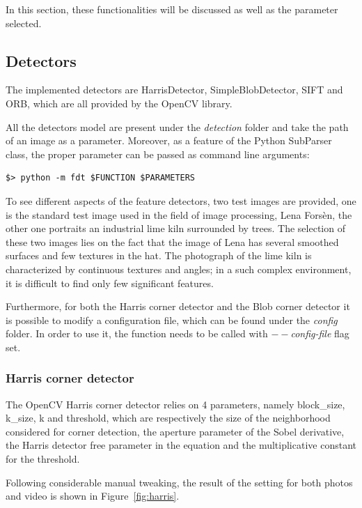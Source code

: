 \documentclass[journal]{IEEEtran}
\begin{document}
In this section, these functionalities will be discussed as well as the parameter selected.

\subsection{Detectors}
The implemented detectors are HarrisDetector, SimpleBlobDetector, SIFT and ORB, which are all provided by the OpenCV library.

All the detectors model are present under the \emph{detection} folder and take the path of an image as a parameter. Moreover, as a feature of the Python SubParser class, the proper parameter can be passed as command line arguments:

\begin{verbatim}
$> python -m fdt $FUNCTION $PARAMETERS
\end{verbatim}

To see different aspects of the feature detectors, two test images are provided, one is the standard test image used in the field of image processing, Lena Forsèn, the other one portraits an industrial lime kiln surrounded by trees. The selection of these two images lies on the fact that the image of Lena has several smoothed surfaces and few textures in the hat. The photograph of the lime kiln is characterized by continuous textures and angles; in a such complex environment, it is difficult to find only few significant features.

Furthermore, for both the Harris corner detector and the Blob corner detector it is possible to modify a configuration file, which can be found under the \emph{config} folder. In order to use it, the function needs to be called with \emph{$--$config-file} flag set.

\subsubsection{Harris corner detector}

The OpenCV Harris corner detector relies on 4 parameters, namely block\_size, k\_size, k and threshold, which are respectively the size of the neighborhood considered for corner detection, the aperture parameter of the Sobel derivative, the Harris detector free parameter in the equation and the multiplicative constant for the threshold.

Following considerable manual tweaking, the result of the setting for both photos and video is shown in Figure~\ref{fig:harris}.
\end{document}
